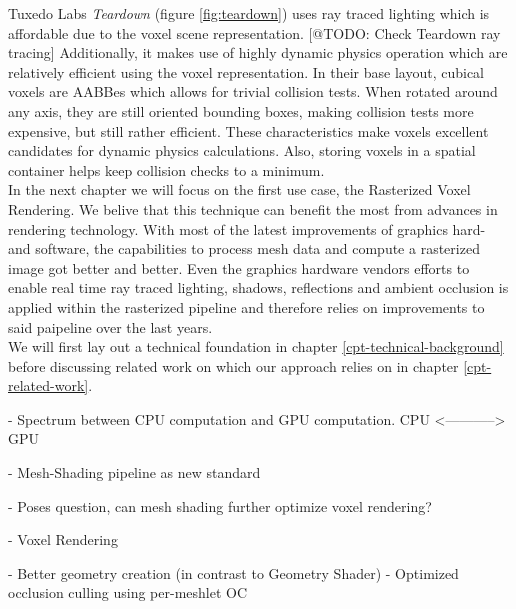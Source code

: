 Tuxedo Labs \emph{Teardown} (figure \ref{fig:teardown}) uses ray traced lighting which is affordable due 
to the voxel scene representation. [@TODO: Check Teardown ray tracing]
Additionally, it makes use of highly dynamic physics operation which are relatively efficient using the voxel 
representation. In their base layout, cubical voxels are \ac{AABB}es which allows for trivial collision tests.
When rotated around any axis, they are still oriented bounding boxes, making collision tests more expensive,
but still rather efficient. These characteristics make voxels excellent candidates for dynamic physics 
calculations. Also, storing voxels in a spatial container helps keep collision checks to a minimum. \\

\noindent
In the next chapter we will focus on the first use case, the Rasterized Voxel Rendering. We belive that this 
technique can benefit the most from advances in rendering technology.
With most of the latest improvements of graphics hard- and software, the capabilities to process mesh data 
and compute a rasterized image got better and better. Even the graphics hardware vendors efforts to enable 
real time ray traced lighting, shadows, reflections and ambient occlusion is applied within the rasterized 
pipeline and therefore relies on improvements to said paipeline over the last years. \\
We will first lay out a technical foundation in chapter \ref{cpt-technical-background} before discussing 
related work on which our approach relies on in chapter \ref{cpt-related-work}.







- Spectrum between CPU computation and GPU computation. 
CPU <-----------> GPU

- Mesh-Shading pipeline as new standard 

- Poses question, can mesh shading further optimize voxel rendering?

- Voxel Rendering

- Better geometry creation (in contrast to Geometry Shader)
- Optimized occlusion culling using per-meshlet OC
